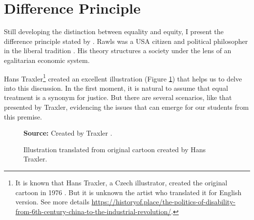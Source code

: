 \section{Difference Principle}
\label{equity-sec:diff-prin}

Still developing the distinction between equality and equity, I present the difference principle stated by . Rawls was a \gls{USA} citizen and political philosopher in the liberal tradition \cite{wenar:2021}. His theory structures a society under the lens of an egalitarian economic system.

Hans Traxler\footnote{It is known that Hans Traxler, a Czech illustrator, created the original cartoon in 1976 \cite{traxler:2019}. But it is unknown the artist who translated it for English version. See more details \url{https://historyof.place/the-politics-of-disability-from-6th-century-china-to-the-industrial-revolution/}.} created an excellent illustration (Figure \ref{fig:fair-selection-traxler}) that helps us to delve into this discussion. In the first moment, it is natural to assume that equal treatment is a synonym for justice. But there are several scenarios, like that presented by Traxler, evidencing the issues that can emerge for our students from this premise. 

\begin{figure}[ht!]
\centering

\caption{\textmd{Illustration translated from original cartoon created by Hans Traxler.}}
\label{fig:fair-selection-traxler}

\par\medskip\ABNTEXfontereduzida\selectfont\textbf{Source:} Created by Traxler \cite{traxler:2019}.%
\end{figure}

